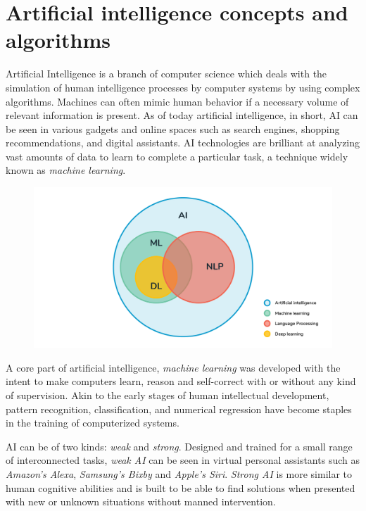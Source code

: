 \documentclass{report}
\begin{document}
\newpage

\chapter {Artificial intelligence concepts and algorithms}

Artificial Intelligence is a branch of computer science which deals with the simulation of human intelligence processes by computer systems by using complex algorithms. Machines can often mimic human behavior if a necessary volume of relevant information is present. As of today artificial intelligence, in short, AI can be seen in various gadgets and online spaces such as search engines, shopping recommendations, and digital assistants. AI technologies are brilliant at analyzing vast amounts of data to learn to complete a particular task, a technique widely known as \textit{machine learning}. \par

\begin{figure}[b]
\centerline{\includegraphics[scale=0.16]{ai}}
\end{figure}

A core part of artificial intelligence, \textit{machine learning} was developed with the intent to make computers learn, reason and self-correct with or without any kind of supervision. Akin to the early stages of human intellectual development, pattern recognition, classification, and numerical regression have become staples in the training of computerized systems. \par

AI can be of two kinds: \textit{weak} and \textit{strong}. Designed and trained for a small range of interconnected tasks, \textit{weak AI} can be seen in virtual personal assistants such as \textit{Amazon's Alexa}, \textit{Samsung's Bixby} and \textit{Apple's Siri}. \textit{Strong AI} is more similar to human cognitive abilities and is built to be able to find solutions when presented with new or unknown situations without manned intervention.\par
\end{document}
